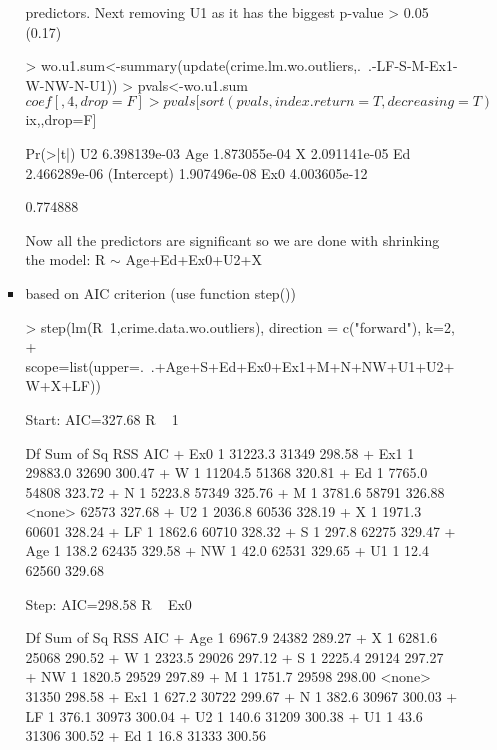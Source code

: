\documentclass[a4paper]{article}
\begin{document}
\begin{itemize}
\begin{itemize}
\begin{itemize}
predictors.
Next removing U1 as it has the biggest p-value > 0.05 (0.17)
\begin{Schunk}
\begin{Sinput}
> wo.u1.sum<-summary(update(crime.lm.wo.outliers,.~.-LF-S-M-Ex1-W-NW-N-U1))
> pvals<-wo.u1.sum$coef[,4, drop=F]
> pvals[sort(pvals,index.return=T,decreasing=T)$ix,,drop=F]
\end{Sinput}
\begin{Soutput}
                Pr(>|t|)
U2          6.398139e-03
Age         1.873055e-04
X           2.091141e-05
Ed          2.466289e-06
(Intercept) 1.907496e-08
Ex0         4.003605e-12
\end{Soutput}
\begin{Soutput}
[1] 0.774888
\end{Soutput}
\end{Schunk}
Now all the predictors are significant so we are done with shrinking the model: 
R $\sim$ Age+Ed+Ex0+U2+X
\item based on AIC criterion (use function step())
\begin{Schunk}
\begin{Sinput}
> step(lm(R~1,crime.data.wo.outliers), direction = c("forward"), k=2, 
+ 		scope=list(upper=.~.+Age+S+Ed+Ex0+Ex1+M+N+NW+U1+U2+W+X+LF))		
\end{Sinput}
\begin{Soutput}
Start:  AIC=327.68
R ~ 1

       Df Sum of Sq   RSS    AIC
+ Ex0   1   31223.3 31349 298.58
+ Ex1   1   29883.0 32690 300.47
+ W     1   11204.5 51368 320.81
+ Ed    1    7765.0 54808 323.72
+ N     1    5223.8 57349 325.76
+ M     1    3781.6 58791 326.88
<none>              62573 327.68
+ U2    1    2036.8 60536 328.19
+ X     1    1971.3 60601 328.24
+ LF    1    1862.6 60710 328.32
+ S     1     297.8 62275 329.47
+ Age   1     138.2 62435 329.58
+ NW    1      42.0 62531 329.65
+ U1    1      12.4 62560 329.68

Step:  AIC=298.58
R ~ Ex0

       Df Sum of Sq   RSS    AIC
+ Age   1    6967.9 24382 289.27
+ X     1    6281.6 25068 290.52
+ W     1    2323.5 29026 297.12
+ S     1    2225.4 29124 297.27
+ NW    1    1820.5 29529 297.89
+ M     1    1751.7 29598 298.00
<none>              31350 298.58
+ Ex1   1     627.2 30722 299.67
+ N     1     382.6 30967 300.03
+ LF    1     376.1 30973 300.04
+ U2    1     140.6 31209 300.38
+ U1    1      43.6 31306 300.52
+ Ed    1      16.8 31333 300.56


\end{Soutput}
\end{Schunk}
\end{itemize}
\end{itemize}
\end{itemize}
\end{document}
